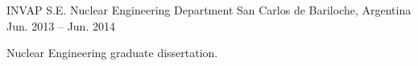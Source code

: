 
\begin{cventries}

  \cventry
    {INVAP S.E.}
    {Nuclear Engineering Department}
    {San Carlos de Bariloche, Argentina}
    {Jun. 2013 -- Jun. 2014}
    {
      \begin{cvitems}
        \item{Nuclear Engineering graduate dissertation.}
      \end{cvitems}
    }

\end{cventries}
